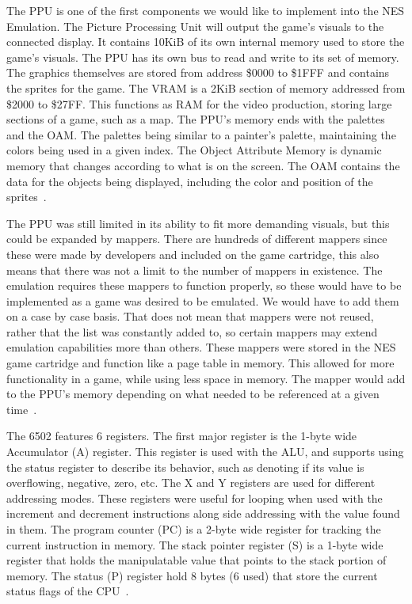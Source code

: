 \documentclass[12pt]{article}
\begin{document}
The PPU is one of the first components we would like to implement into the NES Emulation. The Picture Processing Unit will output 
the game's visuals to the connected display. It contains 10KiB of its own internal memory used to store the game's visuals. The PPU has 
its own bus to read and write to its set of memory. The graphics themselves are stored from address \$0000 to \$1FFF
and contains the sprites for the game. The VRAM is a 2KiB section of memory addressed from \$2000 to \$27FF. This 
functions as RAM for the video production, storing large sections of a game, such as a map. The PPU's memory ends 
with the palettes and the OAM. The palettes being similar to a painter's palette, maintaining the colors being used in a given
index. The Object Attribute Memory is dynamic memory that changes according to what is on the screen. The OAM contains
the data for the objects being displayed, including the color and position of the sprites~\cite{PPU}.

The PPU was still limited in its ability to fit more demanding visuals, but this could be expanded by 
mappers. There are hundreds of different mappers since these were made by developers and included on the game 
cartridge, this also means that there was not a limit to the number of mappers in existence. The emulation 
requires these mappers to function properly, so these would have to be implemented as a game was desired to 
be emulated. We would have to add them on a case by case basis. That does not mean that mappers were not 
reused, rather that the list was constantly added to, so certain mappers may extend emulation capabilities 
more than others. These mappers were stored in the NES game cartridge and function like a page table in 
memory. This allowed for more functionality in a game, while using less space in memory. The mapper would 
add to the PPU's memory depending on what needed to be referenced at a given time~\cite{mappers}. 

The 6502 features 6 registers. The first major register is the 1-byte wide Accumulator (A) register.
This register is used with the ALU, and supports using the status register to describe its behavior,
such as denoting if its value is overflowing, negative, zero, etc. The X and Y registers are used for
different addressing modes. These registers were useful for looping when used with the increment and 
decrement instructions along side addressing with the value found in them. The program counter (PC) is a 
 2-byte wide register for tracking the current instruction in memory. The stack pointer register (S) is a 
1-byte wide register that holds the manipulatable value that points to the stack portion of memory. The
status (P) register hold 8 bytes (6 used) that store the current status flags of the CPU~\cite{cpu_registers}.
\end{document}
